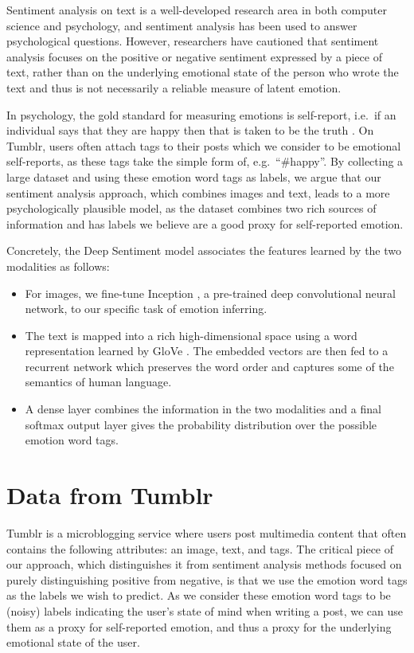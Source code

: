 \documentclass{article} %
\begin{document}
Sentiment analysis on text is a well-developed research area in both computer science and psychology, and sentiment analysis has been used to answer psychological questions. However, researchers have cautioned that sentiment analysis focuses on the positive or negative sentiment expressed by a piece of text, rather than on the underlying emotional state of the person who wrote the text \citep{Flaxman-15} and thus is not necessarily a reliable measure of latent emotion. 

In psychology, the gold standard for measuring emotions is self-report, i.e.~if an individual says that they are happy then that is taken to be the truth \citep{gilbert2006stumbling}. On Tumblr, users often attach tags to their posts which we consider to be emotional self-reports, as these tags take the simple form of, e.g.~``\#happy''. By collecting a large dataset and using these emotion word tags as labels, we argue that our sentiment analysis approach, which combines images and text, leads to a more psychologically plausible model, as the dataset combines two rich sources of information and has labels we believe are a good proxy for self-reported emotion. 

Concretely, the Deep Sentiment model associates the features learned by the two modalities as follows:
\begin{itemize}
    \item For images, we  fine-tune Inception \citep{Szegedy-15}, a pre-trained deep convolutional neural network, to our specific task of emotion inferring.
    \item The text is mapped into a rich high-dimensional space using a word representation learned by GloVe \citep{Pennington-14}. The embedded vectors are then fed to a recurrent network which preserves the word order and captures some of the semantics of human language.
    \item A dense layer combines the information in the two modalities and a final softmax output layer gives the probability distribution over the possible emotion word tags.
\end{itemize}

\section{Data from Tumblr}
\label{tumblr-data}

Tumblr is a microblogging service where users post multimedia content that often contains the following attributes: an image, text, and tags. The critical piece of our approach, which distinguishes it from sentiment analysis methods focused on purely distinguishing positive from negative, is that we use the emotion word tags as the labels we wish to predict. As we consider these emotion word tags to be (noisy) labels indicating the user's state of mind when writing a post, we can use them as a proxy for self-reported emotion, and thus a proxy for the underlying emotional state of the user. 
\end{document}
